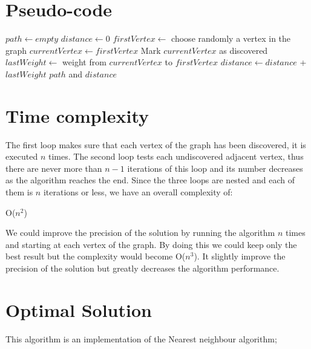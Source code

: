 \documentclass[a4paper, 12pt]{report}
\begin{document}
		\section{Pseudo-code}
			\begin{algorithm}
				\DontPrintSemicolon
				\BlankLine
				$path \leftarrow empty$\;
				$distance \leftarrow 0$\;
				$firstVertex \leftarrow$ choose randomly a vertex in the graph\;
				$currentVertex \leftarrow firstVertex$\;
				Mark $currentVertex$ as discovered\;
				\BlankLine
				\BlankLine
				$lastWeight \leftarrow$ weight from $currentVertex$ to $firstVertex$\;
				$distance \leftarrow distance$ + $lastWeight$\;
			\BlankLine
			\Return $path$ and $distance$\;
			\end{algorithm}

		\section{Time complexity}
			The first loop makes sure that each vertex of the graph has been discovered, it is executed $ n $ times.
			The second loop tests each undiscovered adjacent vertex, thus there are never more than $n-1$ iterations of this loop and its number decreases as the algorithm reaches the end.
			Since the three loops are nested and each of them is $n$ iterations or less, we have an overall complexity of:
			\begin{center}
				O($n^{2}$)
			\end{center}
			We could improve the precision of the solution by running the algorithm $n$ times and starting at each vertex of the graph. By doing this we could keep only the best result but the complexity would become O($n^{3}$). It slightly improve the precision of the solution but greatly decreases the algorithm performance.
		\section{Optimal Solution}
		This algorithm is an implementation of the Nearest neighbour algorithm;
\end{document}
